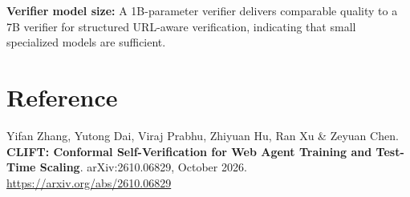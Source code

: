 \documentclass[10pt,twocolumn]{article}
\begin{document}
\textbf{Verifier model size:} A 1B-parameter verifier delivers comparable
quality to a 7B verifier for structured URL-aware verification, indicating
that small specialized models are sufficient.

\section*{Reference}

Yifan Zhang, Yutong Dai, Viraj Prabhu, Zhiyuan Hu, Ran Xu \& Zeyuan Chen.
\textbf{CLIFT: Conformal Self-Verification for Web Agent Training and
Test-Time Scaling}.
arXiv:2610.06829, October 2026.\\
\url{https://arxiv.org/abs/2610.06829}
\end{document}
